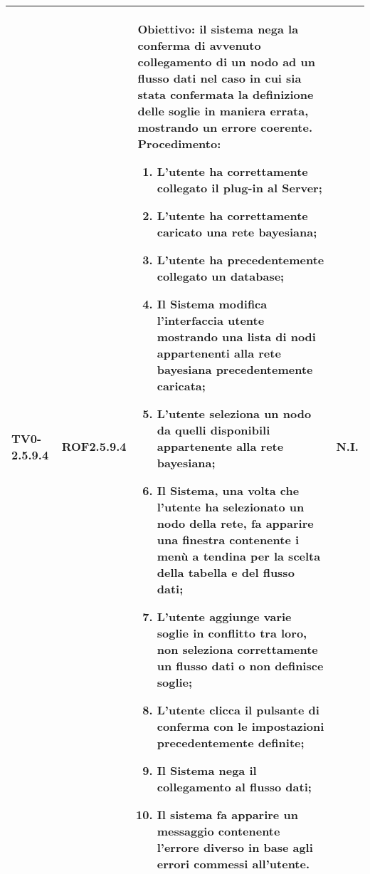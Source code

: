 \begin{longtable}{|C{.15\textwidth}|C{.13\textwidth}|m{.52\textwidth}|C{.08\textwidth}|}
TV0-2.5.9.4 & ROF2.5.9.4  &
	\textbf{Obiettivo}: il sistema nega la conferma di avvenuto collegamento di un nodo ad un flusso dati nel caso in cui sia stata confermata la definizione delle soglie in maniera errata, mostrando un errore coerente. \newline
	\textbf{Procedimento}:
	\begin{enumerate}
		\item L'utente ha correttamente collegato il plug-in al Server;
		\item L'utente ha correttamente caricato una rete bayesiana;
		\item L'utente ha precedentemente collegato un database;
		\item Il Sistema modifica l'interfaccia utente mostrando una lista di nodi appartenenti alla rete bayesiana precedentemente caricata;
		\item L'utente seleziona un nodo da quelli disponibili appartenente alla rete bayesiana;
		\item Il Sistema, una volta che l'utente ha selezionato un nodo della rete, fa apparire una finestra contenente i menù a tendina per la scelta della tabella e del flusso dati;
		\item L'utente aggiunge varie soglie in conflitto tra loro, non seleziona correttamente un flusso dati o non definisce soglie;
		\item L'utente clicca il pulsante di conferma con le impostazioni precedentemente definite;
		\item Il Sistema nega il collegamento al flusso dati;
		\item Il sistema fa apparire un messaggio contenente l'errore diverso in base agli errori commessi all'utente.
	\end{enumerate}
	& N.I. \\
\hline


\end{longtable}
